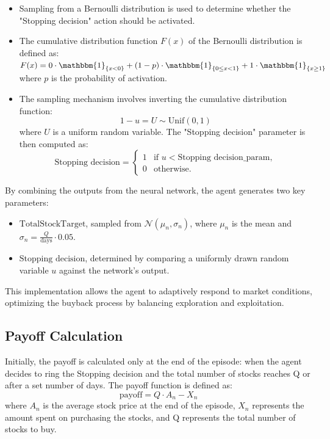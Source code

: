 \documentclass[a4paper, 12pt]{article}
\begin{document}
\begin{itemize}
    \item Sampling from a Bernoulli distribution is used to determine whether the "Stopping decision" action should be activated.
    \item The cumulative distribution function \( F(x) \) of the Bernoulli distribution is defined as:
    $F(x) = 0 \cdot \mathbbm{1}_{\{x < 0\}} + (1 - p) \cdot \mathbbm{1}_{\{0 \leq x < 1\}} + 1 \cdot \mathbbm{1}_{\{x \geq 1\}}$
    where \( p \) is the probability of activation.
    \item The sampling mechanism involves inverting the cumulative distribution function:
    \[
    1 - u = U \sim \text{Unif}(0,1)
    \]
    where \( U \) is a uniform random variable. The "Stopping decision" parameter is then computed as:
    \[
    \text{Stopping decision} = \begin{cases}
    1 & \text{if } u < \text{Stopping decision\_param}, \\
    0 & \text{otherwise}.
    \end{cases}
    \]
\end{itemize}

By combining the outputs from the neural network, the agent generates two key parameters:
\begin{itemize}
    \item \( \text{TotalStockTarget} \), sampled from \( \mathcal{N}(\mu_n, \sigma_n) \), where \( \mu_n \) is the mean and \( \sigma_n = \frac{Q}{\text{days}} \cdot 0.05 \).
    \item \( \text{Stopping decision} \), determined by comparing a uniformly drawn random variable \( u \) against the network's output.
\end{itemize}

This implementation allows the agent to adaptively respond to market conditions, optimizing the buyback process by balancing exploration and exploitation.


\subsection{Payoff Calculation}

Initially, the payoff is calculated only at the end of the episode: when the agent decides to ring the Stopping decision and the total number of stocks reaches Q or after a set number of days. The payoff function is defined as:
\[
\text{payoff} = Q \cdot A_n - X_n
\]
where \( A_n \) is the average stock price at the end of the episode, \( X_n \) represents the amount spent on purchasing the stocks, and Q represents the total number of stocks to buy.
\end{document}
